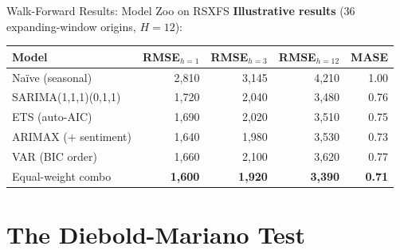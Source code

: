 \documentclass[aspectratio=169, 11pt]{beamer}
\begin{document}
\begin{frame}{Walk-Forward Results: Model Zoo on RSXFS}
  \textbf{Illustrative results} (36 expanding-window origins, $H=12$):
  \begin{center}
    {\footnotesize
    \begin{tabular}{lrrrr}
      \toprule
      \textbf{Model} & \textbf{RMSE$_{h=1}$} & \textbf{RMSE$_{h=3}$}
                     & \textbf{RMSE$_{h=12}$} & \textbf{MASE} \\
      \midrule
      Na\"{i}ve (seasonal)   & 2{,}810 & 3{,}145 & 4{,}210 & 1.00 \\
      SARIMA(1,1,1)(0,1,1)   & 1{,}720 & 2{,}040 & 3{,}480 & 0.76 \\
      ETS (auto-AIC)         & 1{,}690 & 2{,}020 & 3{,}510 & 0.75 \\
      ARIMAX (+ sentiment)   & 1{,}640 & 1{,}980 & 3{,}530 & 0.73 \\
      VAR (BIC order)        & 1{,}660 & 2{,}100 & 3{,}620 & 0.77 \\
      \midrule
      Equal-weight combo     & \textbf{1{,}600} & \textbf{1{,}920}
                             & \textbf{3{,}390} & \textbf{0.71} \\
      \bottomrule
    \end{tabular}
    }
  \end{center}
\end{frame}

\section{The Diebold-Mariano Test}

\end{document}
